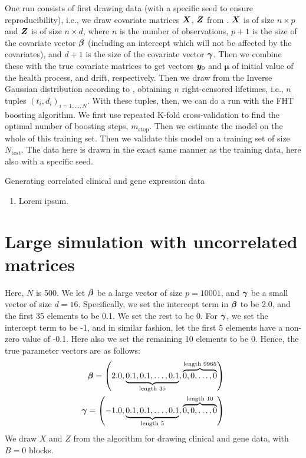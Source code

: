 One run consists of first drawing data (with a specific seed to ensure reproducibility), i.e., we draw covariate matrices $\bm{X}$, $\bm{Z}$ from \label{algo:clinical-sim}. $\bm{X}$ is of size $n\times p$ and $\bm{Z}$ is of size $n\times d$, where $n$ is the number of observations, $p+1$ is the size of the covariate vector $\boldsymbol{\beta}$ (including an intercept which will not be affected by the covariates), and $d+1$ is the size of the covariate vector $\boldsymbol{\gamma}$. Then we combine these with the true covariate matrices to get vectors $\bm{y}_0$ and $\mathbf{\mu}$ of initial value of the health process, and drift, respectively. Then we draw from the Inverse Gaussian distribution according to \label{algo:FHT-sim}, obtaining $n$ right-censored lifetimes, i.e., $n$ tuples $(t_i,d_i)_{i=1,\ldots,N}$. With these tuples, then, we can do a run with the FHT boosting algorithm. We first use repeated K-fold cross-validation to find the optimal number of boosting steps, $m_{\text{stop}}$. Then we estimate the model on the whole of this training set. Then we validate this model on a training set of size $N_{\text{test}}$. The data here is drawn in the exact same manner as the training data, here also with a specific seed.

\begin{algorithm}
\caption{Generating correlated clinical and gene expression data}
\label{algo:clinical-sim}
\begin{enumerate}
    \item Lorem ipsum.
\end{enumerate}
\end{algorithm}

\section{Large simulation with uncorrelated matrices}
Here, $N$ is 500. We let $\boldsymbol{\beta}$ be a large vector of size $p=10001$, and $\boldsymbol{\gamma}$ be a small vector of size $d=16$. Specifically, we set the intercept term in $\boldsymbol{\beta}$ to be 2.0, and the first 35 elements to be 0.1. We set the rest to be 0. For $\boldsymbol{\gamma}$, we set the intercept term to be -1, and in similar fashion, let the first 5 elements have a non-zero value of -0.1. Here also we set the remaining 10 elements to be 0.
Hence, the true parameter vectors are as follows:
\begin{align*}
    \boldsymbol{\beta}=\left(2.0, \underbrace{0.1, 0.1, \ldots, 0.1}_{\text{length 35}}, \overbrace{0, 0, \ldots, 0}^{\text{length 9965}}\right) \\
    \boldsymbol{\gamma}=\left(-1.0, \underbrace{0.1, 0.1, \ldots, 0.1}_{\text{length 5}}, \overbrace{0, 0, \ldots, 0}^{\text{length 10}}\right)
\end{align*}
We draw $X$ and $Z$ from the algorithm for drawing clinical and gene data, with $B=0$ blocks.

